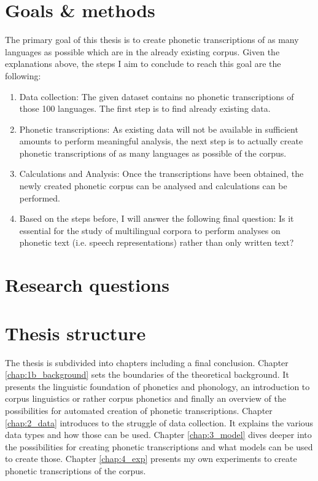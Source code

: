 \section{Goals \& methods}
The primary goal of this thesis is to create phonetic transcriptions of as many languages as possible which are in the already existing corpus. Given the explanations above, the steps I aim to conclude to reach this goal are the following:
\begin{enumerate}
 \item Data collection: The given dataset contains no phonetic transcriptions of those 100 languages. The first step is to find already existing data. 
 \item Phonetic transcriptions: As existing data will not be available in sufficient amounts to perform meaningful analysis, the next step is to actually create phonetic transcriptions of as many languages as possible of the corpus. 
 \item Calculations and Analysis: Once the transcriptions have been obtained, the newly created phonetic corpus can be analysed and calculations can be performed.
 \item Based on the steps before, I will answer the following final question: Is it essential for the study of multilingual corpora to perform analyses on phonetic text (i.e. speech representations) rather than only written text? 
\end{enumerate}

\section{Research questions}
\label{outline}


\section{Thesis structure}

The thesis is subdivided into  chapters including a final conclusion. Chapter \ref{chap:1b_background} sets the boundaries of the theoretical background. It presents the linguistic foundation of phonetics and phonology, an introduction to corpus linguistics or rather corpus phonetics and finally an overview of the possibilities for automated creation of phonetic transcriptions. Chapter \ref{chap:2_data} introduces to the struggle of data collection. It explains the various data types and how those can be used. Chapter \ref{chap:3_model} dives deeper into the possibilities for creating phonetic transcriptions and what models can be used to create those. Chapter \ref{chap:4_exp} presents my own experiments to create phonetic transcriptions of the corpus.


